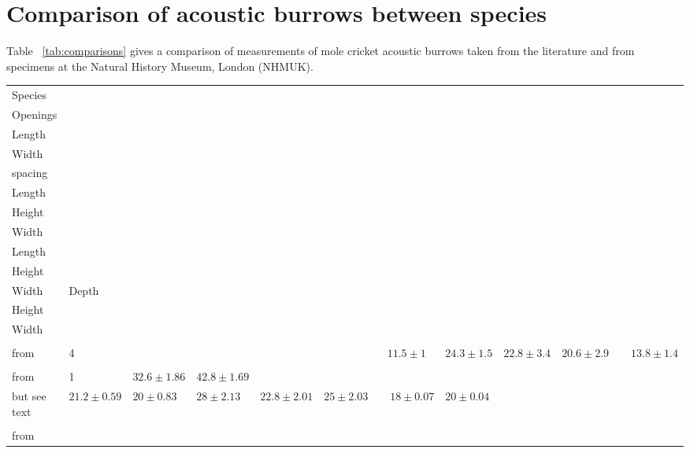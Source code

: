 \documentclass{article}
\begin{document}
   \section{Comparison of acoustic burrows between species}
   Table ~\ref{tab:comparisons} gives a comparison of measurements of mole cricket acoustic burrows taken from the literature and from specimens at the Natural History Museum, London (NHMUK).
   \begin{landscape}
   	\thispagestyle{plain}
   	\begin{table}

   		\tiny
   		\begin{tabular}{|l|l|l|l|l|l|l|l|l|l|l|l|l|l|}
   			\hline 	Species &
		   			\makecell{Number of\\Openings} &
		   			\makecell{Opening\\Length} &
		   			\makecell{Opening\\Width} &
		   			\makecell{Opening\\spacing} &
		   			\makecell{Horn\\Length} &
		   			\makecell{Throat\\Height} &
		   			\makecell{Throat\\Width} &
		   			\makecell{Bulb\\Length} &
		   			\makecell{Bulb\\Height} &
		   			\makecell{Bulb\\Width} &
		   			Depth &
		   			\makecell{Exit\\Height} &
		   			\makecell{Exit\\Width} \\
		   	\hline	\makecell{\textit{Gryllotalpa australis}\\from \cite{kavanagh1989}} &
				   	4 &
				   	&
				   	&
				   	&
				   	&
				   	\multicolumn{2}{c|}{$11.5\pm1$} &
				   	$24.3\pm1.5$ &
				   	$22.8\pm3.4$ &
				   	$20.6\pm2.9$ &
				   	&
				   	\multicolumn{2}{c|}{$13.8\pm1.4$} \\
   			\hline  \makecell{\textit{Gryllotalpa gryllotalpa}\\from \cite{jafari2015}} &
		   			1 &
		   			$32.6\pm1.86$ &
		   			$42.8\pm1.69$ & 
		   			&
		   			\makecell{$45.2\pm2.13$\\but see text} &
		   			$21.2\pm0.59$ &
		   			$20\pm0.83$ &
		   			$28\pm2.13$ &
		   			$22.8\pm2.01$ &
		   			$25\pm2.03$ &
		   			&
		   			$18\pm0.07$ &
		   			$20\pm0.04$ \\ 
   			\hline	\makecell{\textit{Gryllotalpa major}\\from \cite{walker1990}} &

\end{tabular}
\end{table}
\end{landscape}
\end{document}
